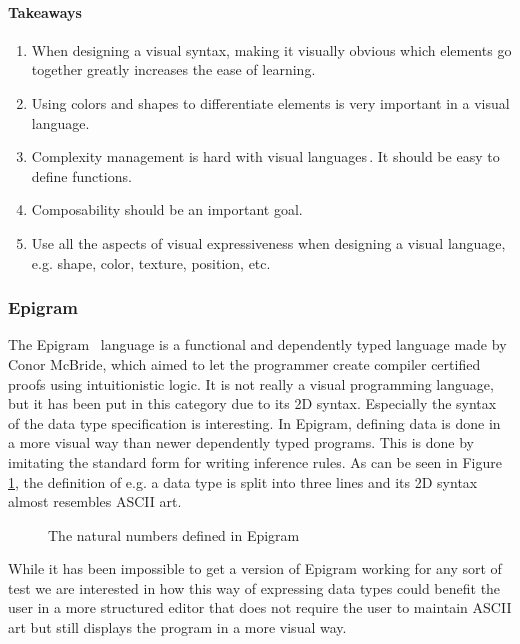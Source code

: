 \paragraph{Takeaways}
\begin{enumerate}
	\item When designing a visual syntax, making it visually obvious which elements go together greatly increases the ease of learning.
	\item Using colors and shapes to differentiate elements is very important in a visual language.
	\item Complexity management is hard with visual languages\,\cite{green1992visual}. It should be easy to define functions.  
	\item Composability should be an important goal.
	\item Use all the aspects of visual expressiveness when designing a visual language, e.g. shape, color, texture, position, etc.
\end{enumerate}

\subsubsection{Epigram}
\label{subsub:Epigram}
The Epigram \,\cite{mcbride2005epigram} language is a functional and dependently typed language made by Conor McBride, which aimed to let the programmer create compiler certified proofs using intuitionistic logic. It is not really a visual programming language, but it has been put in this category due to its 2D syntax. Especially the syntax of the data type specification is interesting. In Epigram, defining data is done in a more visual way than newer dependently typed programs. This is done by imitating the standard form for writing inference rules. As can be seen in Figure \ref{fig:epigram_data}, the definition of e.g. a data type is split into three lines and its 2D syntax almost resembles ASCII art. 

\begin{figure}[htbp]
	\centering
	
	
	\caption{The natural numbers defined in Epigram}
	\label{fig:epigram_data}
\end{figure}

While it has been impossible to get a version of Epigram working for any sort of test we are interested in how this way of expressing data types could benefit the user in a more structured editor that does not require the user to maintain ASCII art but still displays the program in a more visual way.

